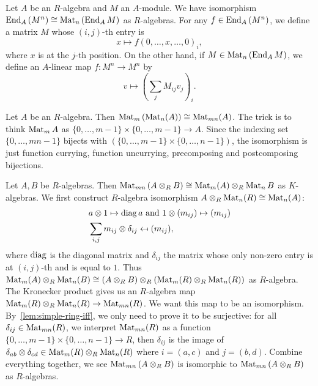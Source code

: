 \begin{construction}
  \label{con:end-vec-iso-matrix}
  Let $A$ be an $R$-algebra and $M$ an $A$-module. We have isomorphism
  $\operatorname{End}_{A}\left(M^{n}\right)\cong \operatorname{Mat}_{n}\left(\operatorname{End}_{A}M\right)$ as
  $R$-algebras. For any $f \in \operatorname{End}_{A}\left(M^{n}\right)$, we define a matrix
  $M$ whose $(i,j)$-th entry is
  \[
    x \mapsto f\left(0,\dots,x,\dots,0\right)_{i},
  \]
  where $x$ is at the $j$-th position. On the other hand, if
  $M \in \operatorname{Mat}_{n}\left(\operatorname{End}_{A}M\right)$, we define an $A$-linear map
  $f : M^{n}\to M^{n}$ by
  \[
    v \mapsto \left(\sum_{j}M_{ij}v_{j}\right)_{i}.
  \]
  \leanok
\end{construction}

\begin{construction}
  \label{con:matrix-matrix}
  Let $A$ be an $R$-algebra. Then $\operatorname{Mat}_{m}\left(\operatorname{Mat}_{n}(A)\right) \cong \operatorname{Mat}_{mn}(A)$.
  The trick is to think $\operatorname{Mat}_{m}A$ as $\{0,\dots,m-1\} \times \{0,\dots,m-1\} \to A$. Since the indexing set $\{0,\dots,mn-1\}$ bijects with $\left(\{0,\dots,m-1\}\times\{0,\dots,n-1\}\right)$, the isomorphism is just function currying, function uncurrying, precomposing and postcomposing bijections.
  \leanok
\end{construction}

\begin{construction}
  \label{con:matrix-tensor-matrix}
  Let $A, B$ be $R$-algebras. Then $\operatorname{Mat}_{mn}\left(A\otimes_{R}B\right)\cong\operatorname{Mat}_{m}(A)\otimes_{R}\operatorname{Mat}_{n}B$ as $K$-algebras. We first construct $R$-algebra isomorphism $A \otimes_{R}\operatorname{Mat}_{n}(R) \cong \operatorname{Mat}_{n}(A)$:
  \[
    \begin{aligned}
      & a \otimes 1 \mapsto \operatorname{diag}{a}~\text{and}~ 1\otimes (m_{ij}) \mapsto (m_{ij})\\
      & \sum_{i,j} m_{ij}\otimes \delta_{ij}\mapsfrom (m_{ij}),
    \end{aligned}
  \]
  where $\operatorname{diag}$ is the diagonal matrix and $\delta_{ij}$ the matrix whose only non-zero entry is at $(i,j)$-th and is equal to $1$.
  Thus $\operatorname{Mat}_{m}(A)\otimes_{R}\operatorname{Mat}_{n}(B)\cong \left(A\otimes_{R}B\right)\otimes_{R} \left(\operatorname{Mat}_{m}(R)\otimes_{R} \operatorname{Mat}_{n}(R)\right)$ as $R$-algebra.
  The Kronecker product gives us an $R$-algebra map $\operatorname{Mat}_{m}(R)\otimes_{R}\operatorname{Mat}_{n}(R) \to \operatorname{Mat}_{mn}(R)$. We want this map to be an isomorphism. By~\cref{lem:simple-ring-iff}, we only need to prove it to be surjective: for all $\delta_{ij} \in \operatorname{Mat}_{mn}(R)$, we interpret $\operatorname{Mat}_{mn}(R)$ as a function $\{0,\dots,m-1\}\times\{0,\dots,n-1\}\to R$, then $\delta_{ij}$ is the image of $\delta_{ab}\otimes \delta_{cd} \in \operatorname{Mat}_{m}(R)\otimes_{R}\operatorname{Mat}_{n}(R)$ where $i = (a, c)$ and $j = (b,d)$. Combine everything together, we see $\operatorname{Mat}_{mn}\left(A\otimes_{R}B\right)$ is isomorphic to $\operatorname{Mat}_{mn}\left(A\otimes_{R} B\right)$ as $R$-algebras.
  \leanok
\end{construction}

